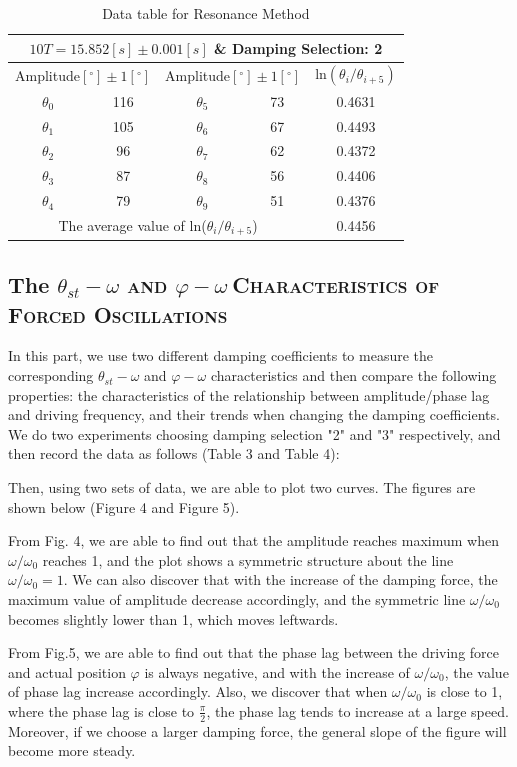 \documentclass[a4paper,12pt]{article}
\begin{document}
\begin{table}[h]
\begin{center}
\begin{tabular}{|c|c|c|c|c|}
\hline
\multicolumn{5}{|c|}{$10T = 15.852 [s] \pm 0.001 [s]$ \& Damping Selection: 2} \\
\hline
\multicolumn{2}{|c|}{Amplitude$[^\circ] \pm 1[^\circ]$} & \multicolumn{2}{c|}{Amplitude$[^\circ] \pm 1[^\circ]$} & ln$(\theta_i/\theta_{i+5})$\\
\hline
~$\theta_0$~ & 116 & ~$\theta_5$~ & 73 & 0.4631 \\
~$\theta_1$~ & 105 & ~$\theta_6$~ & 67 & 0.4493\\
~$\theta_2$~ & 96 & ~$\theta_7$~ & 62 & 0.4372\\
~$\theta_3$~ & 87 & ~$\theta_8$~ & 56 & 0.4406\\
~$\theta_4$~ & 79 & ~$\theta_9$~ & 51 & 0.4376\\
\hline
\multicolumn{4}{|c|}{The average value of ln($\theta_i/\theta_{i+5}$)} & 0.4456 \\
\hline
\end{tabular}
\caption{Data table for Resonance Method}
\end{center}
\end{table}
\subsection{The $\theta_{st}-\omega$ \textsc{and} $\varphi-\omega~$\textsc{Characteristics of Forced Oscillations}}
In this part, we use two different damping coefficients to measure the corresponding $\theta_{st}-\omega$ and $\varphi-\omega$ characteristics and then compare the following properties: the characteristics of the relationship between amplitude/phase lag and driving frequency, and their trends when changing the damping coefficients. We do two experiments choosing damping selection "2" and "3" respectively, and then record the data as follows (Table 3 and Table 4):
\par Then, using two sets of data, we are able to plot two curves. The figures are shown below (Figure 4 and Figure 5).
\par From Fig. 4, we are able to find out that the amplitude reaches maximum when $\omega/\omega_0$ reaches 1, and the plot shows a symmetric structure about the line $\omega/\omega_0 = 1$. We can also discover that with the increase of the damping force, the maximum value of amplitude decrease accordingly, and the symmetric line $\omega/\omega_0$ becomes slightly lower than 1, which moves leftwards.
\par From Fig.5, we are able to find out that the phase lag between the driving force and actual position $\varphi$ is always negative, and with the increase of $\omega/\omega_0$, the value of phase lag increase accordingly. Also, we discover that when $\omega/\omega_0$ is close to 1, where the phase lag is close to $\frac{\pi}{2}$, the phase lag tends to increase at a large speed. Moreover, if we choose a larger damping force, the general slope of the figure will become more steady.
\end{document}
